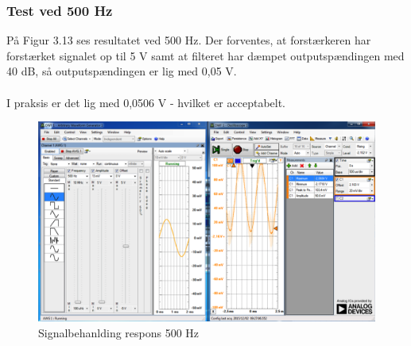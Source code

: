 \subsubsection{Test ved 500 Hz}
På Figur 3.13 ses resultatet ved 500 Hz. Der forventes, at forstærkeren har forstærket signalet op til 5 V samt at filteret har dæmpet outputspændingen med 40 dB, så outputspændingen er lig med 0,05 V.    
\\ \\
I praksis er det lig med 0,0506 V - hvilket er acceptabelt. 

\begin{figure}[H]
	\centering
	\includegraphics[width=1\textwidth]{Figurer/Snip20151202_29}
	\caption{Signalbehanlding respons 500 Hz}
	\label{fig:Signalbehanlding}
\end{figure}




